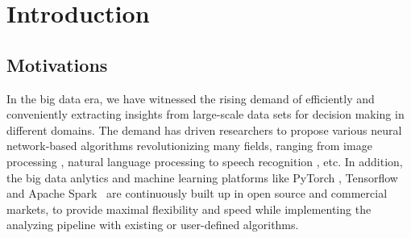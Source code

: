 \documentclass [PhD] {uclathes}
\begin{document}






\chapter{Introduction}


\section{Motivations}
In the big data era, we have witnessed the rising demand of efficiently and conveniently extracting insights  from large-scale data sets for decision making in different domains. The demand has driven researchers to propose various  neural network-based algorithms revolutionizing many fields, ranging from image processing \citep{he2016deep}, natural language processing \citep{devlin2018bert} to speech recognition \citep{amodei2016deep}, etc. In addition, the big data anlytics and machine learning platforms like PyTorch \citep{paszke2019pytorch}, Tensorflow~\citep{abadi2016tensorflow} and Apache Spark~\citep{zaharia2010spark} are continuously built up in open source and commercial markets, to provide maximal flexibility and speed while implementing the analyzing pipeline with existing or user-defined algorithms. 
\end{document}
